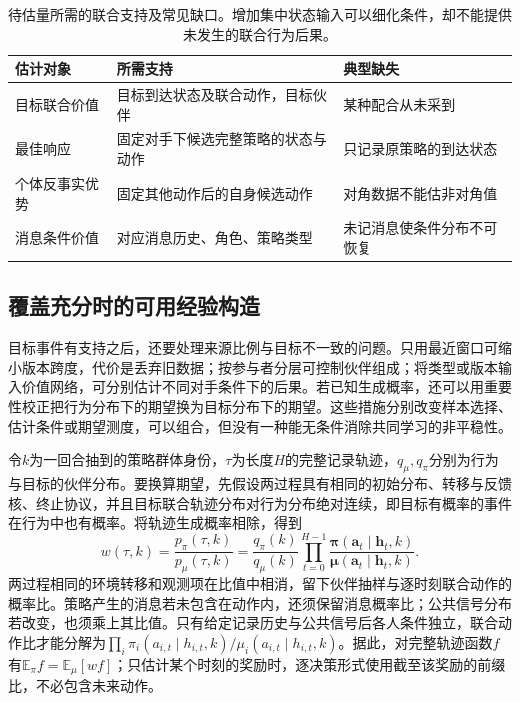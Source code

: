 \begin{table}[htbp]
 \centering
 \begin{tabularx}{\linewidth}{@{}l >{\raggedright\arraybackslash}X >{\raggedright\arraybackslash}X@{}}
 \toprule
 估计对象 & 所需支持 & 典型缺失\\
 \midrule
 目标联合价值 & 目标到达状态及联合动作，目标伙伴 & 某种配合从未采到\\
 最佳响应 & 固定对手下候选完整策略的状态与动作 & 只记录原策略的到达状态\\
 个体反事实优势 & 固定其他动作后的自身候选动作 & 对角数据不能估非对角值\\
 消息条件价值 & 对应消息历史、角色、策略类型 & 未记消息使条件分布不可恢复\\
 \bottomrule
 \end{tabularx}
 \caption{待估量所需的联合支持及常见缺口。增加集中状态输入可以细化条件，却不能提供未发生的联合行为后果。}
 \label{tab:rl-multi-agent-support}
\end{table}

\subsection{覆盖充分时的可用经验构造}
\label{sec:rl-multi-agent-reweight}

目标事件有支持之后，还要处理来源比例与目标不一致的问题。只用最近窗口可缩小版本跨度，代价是丢弃旧数据；按参与者分层可控制伙伴组成；将类型或版本输入价值网络，可分别估计不同对手条件下的后果。若已知生成概率，还可以用重要性校正把行为分布下的期望换为目标分布下的期望。这些措施分别改变样本选择、估计条件或期望测度，可以组合，但没有一种能无条件消除共同学习的非平稳性。

令$k$为一回合抽到的策略群体身份，$\tau$为长度$H$的完整记录轨迹，$q_\mu,q_\pi$分别为行为与目标的伙伴分布。要换算期望，先假设两过程具有相同的初始分布、转移与反馈核、终止协议，并且目标联合轨迹分布对行为分布绝对连续，即目标有概率的事件在行为中也有概率。将轨迹生成概率相除，得到
\begin{equation}
 w(\tau,k)=\frac{p_\pi(\tau,k)}{p_\mu(\tau,k)}
 =\frac{q_\pi(k)}{q_\mu(k)}
   \prod_{t=0}^{H-1}
   \frac{\bm\pi(\bm a_t\mid\bm h_t,k)}
        {\bm\mu(\bm a_t\mid\bm h_t,k)}.
 \label{eq:rl-multi-agent-is}
\end{equation}
两过程相同的环境转移和观测项在比值中相消，留下伙伴抽样与逐时刻联合动作的概率比。策略产生的消息若未包含在动作内，还须保留消息概率比；公共信号分布若改变，也须乘上其比值。只有给定记录历史与公共信号后各人条件独立，联合动作比才能分解为$\prod_i\pi_i(a_{i,t}\mid h_{i,t},k)/\mu_i(a_{i,t}\mid h_{i,t},k)$。据此，对完整轨迹函数$f$有$\mathbb E_\pi f=\mathbb E_\mu[wf]$；只估计某个时刻的奖励时，逐决策形式使用截至该奖励的前缀比，不必包含未来动作。

